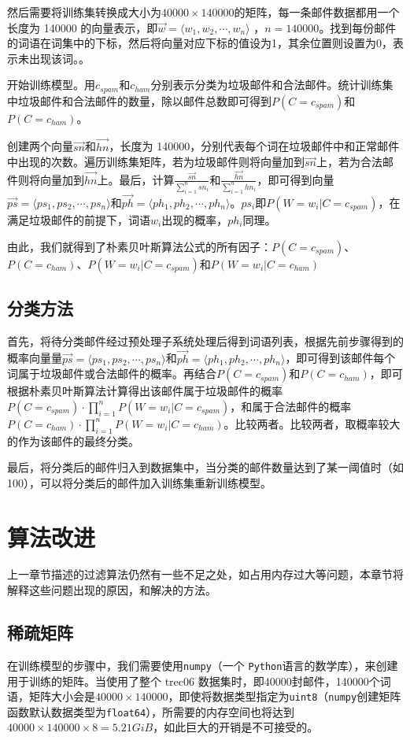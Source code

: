\documentclass[UTF8,zihao=-4]{ctexart}
\begin{document}
	然后需要将训练集转换成大小为$40000 \times 140000$的矩阵，每一条邮件数据都用一个长度为 140000 的向量表示，即$\vec{w}=\langle w_1,w_2, \cdots ,w_n\rangle$ ，$n=140000$。找到每份邮件的词语在词集中的下标，然后将向量对应下标的值设为1，其余位置则设置为0，表示未出现该词。。
	
	
	开始训练模型。用$c_{spam}$和$c_{ham}$分别表示分类为垃圾邮件和合法邮件。统计训练集中垃圾邮件和合法邮件的数量，除以邮件总数即可得到$P(C=c_{spam})$和$P(C=c_{ham})$。
	
	创建两个向量$\vec{sn}$和$\vec{hn}$，长度为 140000，分别代表每个词在垃圾邮件中和正常邮件中出现的次数。遍历训练集矩阵，若为垃圾邮件则将向量加到$\vec{sn}$上，若为合法邮件则将向量加到$\vec{hn}$上。最后，计算$\frac{\vec{sn}}{\sum_{i=1}^{n}sn_i}$和$\frac{\vec{hn}}{\sum_{i=1}^{n}hn_i}$，即可得到向量$\vec{ps}=\langle ps_1,ps_2,\cdots,ps_n\rangle$和$\vec{ph}=\langle ph_1,ph_2,\cdots,ph_n\rangle$。$ps_i$即$P(W=w_i|C=c_{spam})$，在满足垃圾邮件的前提下，词语$w_i$出现的概率，$ph_i$同理。
	
	由此，我们就得到了朴素贝叶斯算法公式的所有因子：$P(C=c_{spam})$、$P(C=c_{ham})$、$P(W=w_i|C=c_{spam})$和$P(W=w_i|C=c_{ham})$
	
\subsection{分类方法}
	首先，将待分类邮件经过预处理子系统处理后得到词语列表，根据先前步骤得到的概率向量量$\vec{ps}=\langle ps_1,ps_2,\cdots,ps_n\rangle$和$\vec{ph}=\langle ph_1,ph_2,\cdots,ph_n\rangle$，即可得到该邮件每个词属于垃圾邮件或合法邮件的概率。再结合$P(C=c_{spam})$和$P(C=c_{ham})$，即可根据朴素贝叶斯算法计算得出该邮件属于垃圾邮件的概率$P(C=c_{spam}) \cdot \prod\limits_{i=1}^{n} P(W=w_i|C=c_{spam})$，和属于合法邮件的概率$P(C=c_{ham}) \cdot \prod\limits_{i=1}^{n} P(W=w_i|C=c_{ham})$。比较两者。比较两者，取概率较大的作为该邮件的最终分类。
	
	最后，将分类后的邮件归入到数据集中，当分类的邮件数量达到了某一阈值时（如100），可以将分类后的邮件加入训练集重新训练模型。

\newpage
\section{算法改进}
	上一章节描述的过滤算法仍然有一些不足之处，如占用内存过大等问题，本章节将解释这些问题出现的原因，和解决的方法。
\subsection{稀疏矩阵}
	在训练模型的步骤中，我们需要使用\texttt{numpy}（一个 \texttt{Python}语言的数学库），来创建用于训练的矩阵。当使用了整个 trec06 数据集时，即40000封邮件，140000个词语，矩阵大小会是$40000\times140000$，即使将数据类型指定为\texttt{uint8}（\texttt{numpy}创建矩阵函数默认数据类型为\texttt{float64}），所需要的内存空间也将达到$40000\times140000\times8=5.21GiB$，如此巨大的开销是不可接受的。
	
\end{document}
